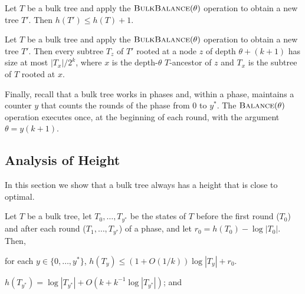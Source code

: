 \documentclass[kpfonts]{patmorin}
\let\le\leqslant
\begin{document}
\begin{lem}
  Let $T$ be a bulk tree and apply the $\textsc{BulkBalance}(\theta)$ operation to obtain a new tree $T'$.  Then $h(T')\le h(T)+1$.
\end{lem}

\begin{lem}
  Let $T$ be a bulk tree and apply the $\textsc{BulkBalance}(\theta)$ operation to obtain a new tree $T'$.  Then every subtree $T_z$ of $T'$ rooted at a node $z$ of depth $\theta+(k+1)$ has size at most $|T_x|/2^k$, where $x$ is the depth-$\theta$ $T$-ancestor of $z$ and $T_x$ is the subtree of $T$ rooted at $x$.
\end{lem}

Finally, recall that a bulk tree works in phases and, within a phase, maintains a counter $y$ that counts the rounds of the phase from $0$ to $y^*$.  The $\textsc{Balance}(\theta)$ operation executes once, at the beginning of each round, with the argument $\theta=y(k+1)$.

\subsection{Analysis of Height}

In this section we show that a bulk tree always has a height that is close to optimal.

\begin{lem}
  Let $T$ be a bulk tree, let $T_0,\ldots,T_{y^*}$ be the states of $T$ before the first round ($T_0$) and after each round ($T_1,\ldots,T_{y^*}$) of a phase, and let $r_0=h(T_0)-\log|T_0|$.  Then,
  \begin{compactenum}[(i)]
    \item for each $y\in\{0,\ldots,y^*\}$, $h(T_y)\le (1+O(1/k))\log|T_y| + r_0$.
    \item $h(T_{y^*}) = \log|T_{y^*}|+O(k+k^{-1}\log|T_{y^*}|)$; and 
  \end{compactenum}
\end{lem}
\end{document}
